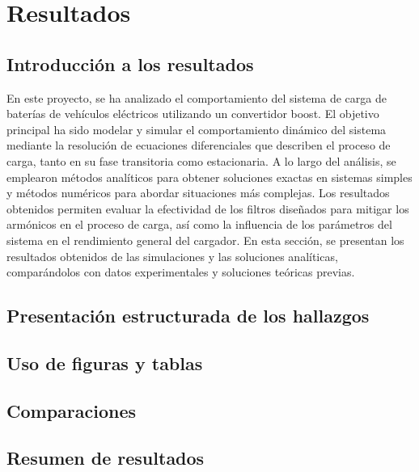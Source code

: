 \section{Resultados}

\subsection{Introducción a los resultados}
En este proyecto, se ha analizado el comportamiento del sistema de carga de baterías de vehículos eléctricos utilizando un convertidor boost. El objetivo principal ha sido modelar y simular el comportamiento dinámico del sistema mediante la resolución de ecuaciones diferenciales que describen el proceso de carga, tanto en su fase transitoria como estacionaria. A lo largo del análisis, se emplearon métodos analíticos para obtener soluciones exactas en sistemas simples y métodos numéricos para abordar situaciones más complejas. Los resultados obtenidos permiten evaluar la efectividad de los filtros diseñados para mitigar los armónicos en el proceso de carga, así como la influencia de los parámetros del sistema en el rendimiento general del cargador. En esta sección, se presentan los resultados obtenidos de las simulaciones y las soluciones analíticas, comparándolos con datos experimentales y soluciones teóricas previas.

\subsection{Presentación estructurada de los hallazgos}

\subsection{Uso de figuras y tablas}

\subsection{Comparaciones}

\subsection{Resumen de resultados}
